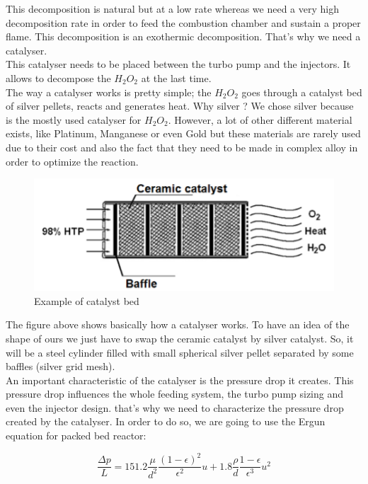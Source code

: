 This decomposition is natural but at a low rate whereas we need a very high decomposition rate in order to feed the combustion chamber and sustain a proper flame. This decomposition is an exothermic decomposition. That's why we need a catalyser. \\

This catalyser needs to be placed between the turbo pump and the injectors. It allows to decompose the $H_2O_2$ at the last time. \\

The way a catalyser works is pretty simple; the $H_2O_2$ goes through a catalyst bed of silver pellets, reacts and generates heat. 
Why silver ? We chose silver because is the mostly used catalyser for $H_2O_2$. However, a lot of other different material exists, like Platinum, Manganese or even Gold but these materials are rarely used due to their cost and also the fact that they need to be made in complex alloy in order to optimize the reaction. 

\begin{figure}[H]
	\centering
	\includegraphics{catalyst}
	\caption{Example of catalyst bed}
\end{figure}

The figure above shows basically how a catalyser works. To have an idea of the shape of ours we just have to swap the ceramic catalyst by silver catalyst. So, it will be a steel cylinder filled with small spherical silver pellet separated by some baffles (silver grid mesh). \\

An important characteristic of the catalyser is the pressure drop it creates. This pressure drop influences the whole feeding system, the turbo pump sizing and even the injector design. that's why we need to characterize the pressure drop created by the catalyser. In order to do so, we are going to use the Ergun equation for packed bed reactor:

$$
\frac{\Delta p}{L} = 151.2 \frac{\mu}{d^2}\frac{(1-\epsilon)^2}{\epsilon^2}u + 1.8 \frac{\rho}{d}\frac{1- \epsilon}{\epsilon^3}u^2
$$

